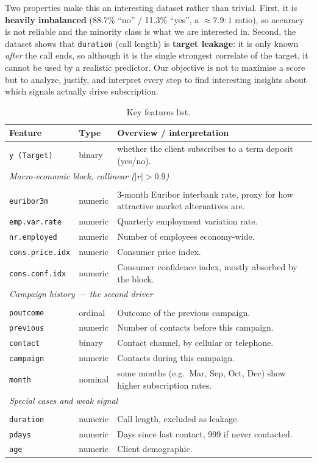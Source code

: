 \documentclass[11pt]{article}
\begin{document}
Two properties make this an interesting dataset rather than trivial. First, it is \textbf{heavily imbalanced}
(88.7\% ``no'' / 11.3\% ``yes'', a $\approx 7.9{:}1$ ratio), so accuracy is not reliable and the minority
class is what we are interested in. Second, the dataset shows that \texttt{duration} (call length) is
\textbf{target leakage}: it is only known \emph{after} the call ends, so although it is the single
strongest correlate of the target, it cannot be used by a realistic predictor. Our objective is not to maximise a score but to analyze, justify, and interpret every step to find interesting insights about which signals actually drive subscription.


\begin{table}[H]
\centering\small
\caption{Key features list.}
\label{tab:features}
\begin{tabular}{l l p{7cm}}
\toprule
Feature & Type & Overview / interpretation \\
\midrule
\texttt{y (Target)} & binary & whether the client subscribes to a term deposit (yes/no). \\
\midrule
\multicolumn{3}{l}{\emph{Macro-economic block, collinear ($|r|>0.9$)}}\\\\
\texttt{euribor3m}      & numeric & 3-month Euribor interbank rate, proxy for how attractive market alternatives are. \\
\texttt{emp.var.rate}   & numeric & Quarterly employment variation rate. \\
\texttt{nr.employed}    & numeric & Number of employees economy-wide. \\
\texttt{cons.price.idx} & numeric & Consumer price index. \\
\texttt{cons.conf.idx}  & numeric & Consumer confidence index, mostly absorbed by the block. \\
\midrule
\multicolumn{3}{l}{\emph{Campaign history --- the second driver}}\\\\
\texttt{poutcome} & ordinal & Outcome of the previous campaign. \\
\texttt{previous} & numeric & Number of contacts before this campaign. \\
\texttt{contact}  & binary  & Contact channel, by cellular or telephone. \\
\texttt{campaign} & numeric & Contacts during this campaign. \\
\texttt{month}    & nominal & some months (e.g.\ Mar, Sep, Oct, Dec) show higher subscription rates. \\
\midrule
\multicolumn{3}{l}{\emph{Special cases and weak signal}}\\\\
\texttt{duration} & numeric & Call length, excluded as leakage. \\
\texttt{pdays}    & numeric & Days since last contact, 999 if never contacted. \\
\texttt{age}      & numeric & Client demographic. \\
\bottomrule
\end{tabular}
\end{table}
\end{document}
